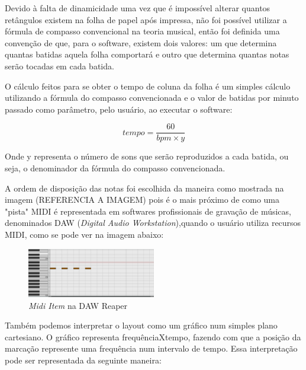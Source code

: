 \documentclass[12pt]{report}
\begin{document}
Devido à falta de dinamicidade uma vez que é impossível alterar quantos retângulos existem na folha de papel após impressa, não foi possível utilizar a fórmula de compasso convencional na teoria musical, então foi definida uma convenção de que, para o software, existem dois valores: um que determina quantas batidas aquela folha comportará e outro que determina quantas notas serão tocadas em cada batida.

O cálculo feitos para se obter o tempo de coluna da folha é um simples cálculo utilizando a fórmula do compasso convencionada e o valor de batidas por minuto passado como parâmetro, pelo usuário, ao executar o software:

\begin{equation}
tempo = \dfrac{60}{bpm \times y}
\end{equation}

Onde y representa o número de sons que serão reproduzidos a cada batida, ou seja, o denominador da fórmula do compasso convencionada.

A ordem de disposição das notas foi escolhida da maneira como mostrada na imagem (REFERENCIA A IMAGEM) pois é o mais próximo de como uma "pista" MIDI é representada em softwares profissionais de gravação de músicas, denominados DAW ({\it Digital Audio Workstation}),quando o usuário utiliza recursos MIDI, como se pode ver na imagem abaixo:

\begin{figure}[H]
  \centering
    \includegraphics[width=0.5\textwidth]{imagens/midi_item_reaper.png}
    \caption{{\it Midi Item} na DAW Reaper}
  \label{fig:reaper}
\end{figure}

Também podemos interpretar o layout como um gráfico num simples plano cartesiano. O gráfico representa frequênciaXtempo, fazendo com que a posição da marcação represente uma frequência num intervalo de tempo. Essa interpretação pode ser representada da seguinte maneira:
\end{document}
